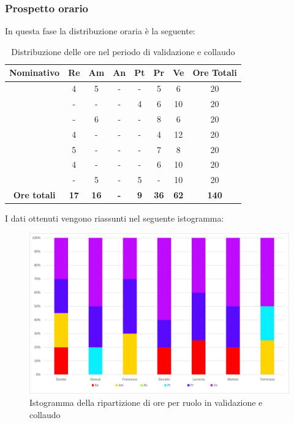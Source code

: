 \subsubsection{Prospetto orario}
In questa fase la distribuzione oraria è la seguente:
\begin{table}[H]
		\begin{center}
			\setlength{\aboverulesep}{0pt}
			\setlength{\belowrulesep}{0pt}
			\setlength{\extrarowheight}{.75ex}
			\begin{tabular}{ c c c c c c c c }
				\rowcolor{AzzurroGruppo!30} 
				\textbf{Nominativo} & \textbf{Re} & \textbf{Am} & \textbf{An} & \textbf{Pt} & \textbf{Pr} & \textbf{Ve} & \textbf{Ore Totali}  \\
				\toprule
				\Davide    & 4 & 5 & - & - & 5 & 6 & 20 \\
				\Giosue    & - & - & - & 4 & 6 & 10 & 20 \\
				\Francesco & - & 6 & - & - & 8 & 6 & 20\\
				\Daniele   & 4 & - & - & - & 4 & 12 & 20\\
				\Lucrezia  & 5 & - & - & - & 7 & 8 & 20\\
				\Matteo    & 4 & - & - & - & 6 & 10 & 20\\
				\Tommaso   & - & 5 & - & 5 & - & 10 & 20\\
				 \textbf{Ore totali} & \textbf{17} & \textbf{16} & \textbf{-} & \textbf{9} & \textbf{36} & \textbf{62} & \textbf{140} \\
				\bottomrule
			\end{tabular}
			\caption{Distribuzione delle ore nel periodo di validazione e collaudo}
		\end{center}
	\end{table}
	I dati ottenuti vengono riassunti nel seguente istogramma:
	\begin{figure}[H]
    \centering
    \includegraphics[scale = 0.5]{components/img/Sprint-10-11-isto.png}
    \caption{Istogramma della ripartizione di ore per ruolo in validazione e collaudo}
    \label{fig:Istogramma ripartizione ore , fase di validazione e collaudo}
\end{figure}
